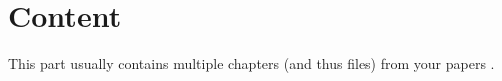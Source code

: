 \chapter{Content}
\label{cha:content}

This part usually contains multiple chapters (and thus files) from your papers \cite{Xing:2014:APR,Xing:2015:AHA}.

